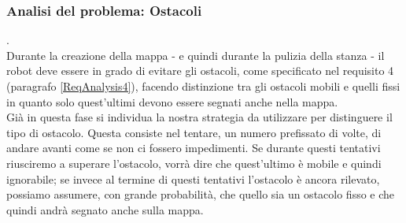 \documentclass{llncs}
\begin{document}
\subsubsection{Analisi del problema: Ostacoli}.
\label{AnalisiReq5Ostacoli}
\vspace*{1ex}
\\
Durante la creazione della mappa - e quindi durante la pulizia della stanza - il robot deve essere in grado di evitare gli ostacoli, come specificato nel requisito 4 (paragrafo \hyperref[ReqAnalysis4]{\ref{ReqAnalysis4}}), facendo distinzione tra gli ostacoli mobili e quelli fissi in quanto solo quest'ultimi devono essere segnati anche nella mappa.\\
Gi\`a in questa fase si individua la nostra strategia da utilizzare per distinguere il tipo di ostacolo. Questa consiste nel tentare, un numero prefissato di volte, di andare avanti come se non ci fossero impedimenti. Se durante questi tentativi riusciremo a superare l'ostacolo, vorr\`a dire che quest'ultimo \`e mobile e quindi ignorabile; se invece al termine di questi tentativi l'ostacolo \`e ancora rilevato, possiamo assumere, con grande probabilit\`a, che quello sia un ostacolo fisso e che quindi andr\`a segnato anche sulla mappa.

\end{document}
